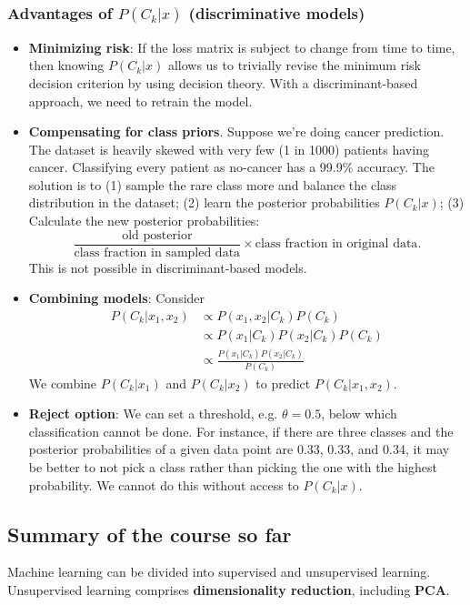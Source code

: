 \documentclass[a4paper,12pt]{article}
\begin{document}
\subsubsection{Advantages of $P(C_k|x)$ (discriminative models)}
 
\begin{itemize}
\item
\textbf{Minimizing risk}: If the loss matrix is subject to change from time to time, then knowing $P(C_k|x)$ allows us to trivially revise the minimum risk decision criterion by using decision theory. With a discriminant-based approach, we need to retrain the model. 
\item
\textbf{Compensating for class priors}. Suppose we're doing cancer prediction. The dataset is heavily skewed with very few (1 in 1000) patients having cancer. Classifying every patient as no-cancer has a 99.9\% accuracy. The solution is to (1) sample the rare class more and balance the class distribution in the dataset; (2) learn the posterior probabilities $P(C_k|x)$; (3) Calculate the new posterior probabilities: 
$$\frac{\text{old posterior}}{\text{class fraction in sampled data}} \times \text{class fraction in original data}.$$
This is not possible in discriminant-based models.
\item
\textbf{Combining models}: Consider 
\begin{align*}
P(C_k|x_1, x_2) &\propto P(x_1, x_2|C_k)P(C_k)\\
				&\propto P(x_1|C_k)P(x_2|C_k)P(C_k)\\
				&\propto \frac{P(x_1|C_k)P(x_2|C_k)}{P(C_k)}
\end{align*}
We combine $P(C_k|x_1)$ and $P(C_k|x_2)$ to predict $P(C_k|x_1, x_2)$. 
\item
\textbf{Reject option}: We can set a threshold, e.g. $\theta = 0.5$, below which classification cannot be done. For instance, if there are three classes and the posterior probabilities of a given data point are 0.33, 0.33, and 0.34, it may be better to not pick a class rather than picking the one with the highest probability. We cannot do this without access to $P(C_k|x)$. 
\end{itemize}

\subsection{Summary of the course so far}

Machine learning can be divided into supervised and unsupervised learning. 
Unsupervised learning comprises \textbf{dimensionality reduction}, including \textbf{PCA}. 
\end{document}
